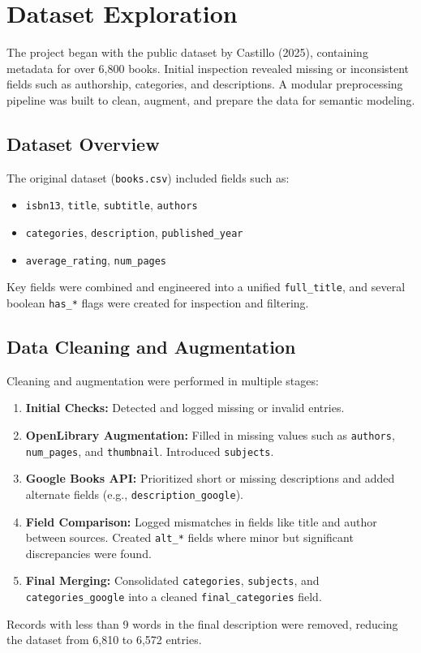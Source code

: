 \chapter{Dataset Exploration}
\label{chapter:dataset}

The project began with the public dataset by Castillo (2025), containing metadata for over 6,800 books. Initial inspection revealed missing or inconsistent fields such as authorship, categories, and descriptions. A modular preprocessing pipeline was built to clean, augment, and prepare the data for semantic modeling.

\section{Dataset Overview}
The original dataset (\texttt{books.csv}) included fields such as:
\begin{itemize}
\item \verb|isbn13|, \verb|title|, \verb|subtitle|, \verb|authors|
\item \verb|categories|, \verb|description|, \verb|published_year|
\item \verb|average_rating|, \verb|num_pages|
\end{itemize}
Key fields were combined and engineered into a unified \verb|full_title|, and several boolean \verb|has_*| flags were created for inspection and filtering.

\section{Data Cleaning and Augmentation}
Cleaning and augmentation were performed in multiple stages:
\begin{enumerate}
\item \textbf{Initial Checks:} Detected and logged missing or invalid entries.
\item \textbf{OpenLibrary Augmentation:} Filled in missing values such as \texttt{authors}, \texttt{num\_pages}, and \texttt{thumbnail}. Introduced \texttt{subjects}.
\item \textbf{Google Books API:} Prioritized short or missing descriptions and added alternate fields (e.g., \texttt{description\_google}).
\item \textbf{Field Comparison:} Logged mismatches in fields like title and author between sources. Created \texttt{alt\_*} fields where minor but significant discrepancies were found.
\item \textbf{Final Merging:} Consolidated \texttt{categories}, \texttt{subjects}, and \texttt{categories\_google} into a cleaned \texttt{final\_categories} field.
\end{enumerate}
Records with less than 9 words in the final description were removed, reducing the dataset from 6,810 to 6,572 entries.

